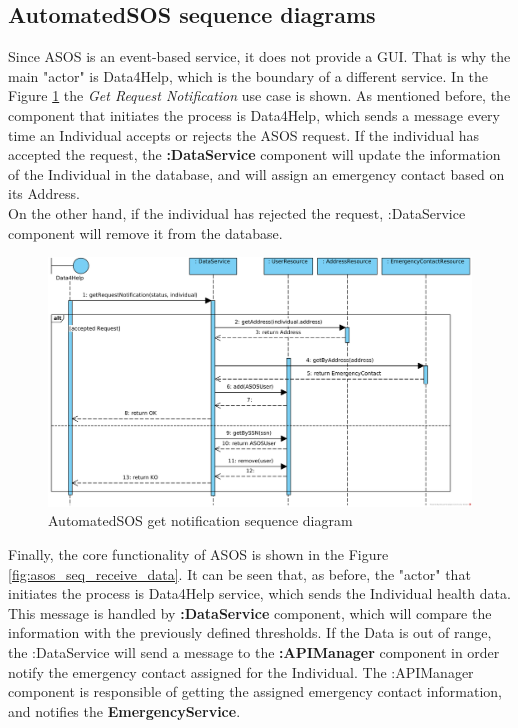 \documentclass[a4paper, hidelinks, 12pt]{report}
\begin{document}
\begin{itemize}
	\subsection{AutomatedSOS sequence diagrams}
	Since ASOS is an event-based service, it does not provide a GUI. That is why the main "actor" is Data4Help, which is the boundary of a different service. In the Figure \ref{fig:asos_seq_get_notification} the \textit{Get Request Notification} use case is shown. As mentioned before, the component that initiates the process is Data4Help, which sends a message every time an Individual accepts or rejects the ASOS request. If the individual has accepted the request, the \textbf{:DataService} component will update the information of the Individual in the database, and will assign an emergency contact based on its Address.\\
	
	On the other hand, if the individual has rejected the request, :DataService component will remove it from the database.\\
	
	\begin{figure}[H]
		\centering
		\includegraphics[width=1\textwidth]{diagrams/sequence_diagrams/asos_get_individual_notification.png}
		\caption[AutomatedSOS get notification sequence diagram]{AutomatedSOS get notification sequence diagram}
		\label{fig:asos_seq_get_notification}
	\end{figure}
	
	Finally, the core functionality of ASOS is shown in the Figure \ref{fig:asos_seq_receive_data}. It can be seen that, as before, the "actor" that initiates the process is Data4Help service, which sends the Individual health data. This message is handled by \textbf{:DataService} component, which will compare the information with the previously defined thresholds. If the Data is out of range, the :DataService will send a message to the \textbf{:APIManager} component in order notify the emergency contact assigned for the Individual. The :APIManager component is responsible of getting the assigned emergency contact information, and notifies the \textbf{EmergencyService}.\\
	

\end{itemize}
\end{document}
